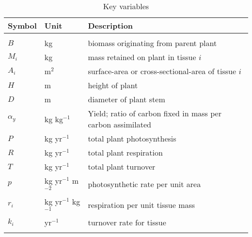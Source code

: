 \documentclass[a4paper,11pt]{article}
\begin{document}
\newpage

\begin{table}[ht]
 \caption{Key variables}
\centering
{\footnotesize 
  \begin{tabular}{p{2cm}p{2cm}p{7cm}}
  \\
  \hline
  Symbol & Unit & Description \\
  \hline
\\
  $B$   & kg  & biomass originating from parent plant\\
  $M_i$ & kg  & mass retained on plant in tissue $i$\\
  $A_i$ & m$^2$  & surface-area or cross-sectional-area of tissue $i$\\
  $H$   & m  & height of plant\\
  $D$   & m  & diameter of plant stem\\
  $\alpha_y$ & kg kg$^{-1}$ & Yield; ratio of carbon fixed in mass per carbon assimilated \\
  $P$ & kg yr$^{-1}$ & total plant photosynthesis \\
  $R$ & kg yr$^{-1}$ & total plant respiration \\
  $T$ & kg yr$^{-1}$ & total plant turnover \\
  $p$ & kg yr$^{-1}$ m$^{-2}$  & photosynthetic rate per unit area \\
  $r_i$ & kg yr$^{-1}$ kg$^{-1}$  & respiration per unit tissue mass \\
  $k_i$ & yr$^{-1}$ & turnover rate for tissue \\
  \\\hline
  \end{tabular}
}
\label{tab:definitions}
\end{table}

\newpage
\end{document}
